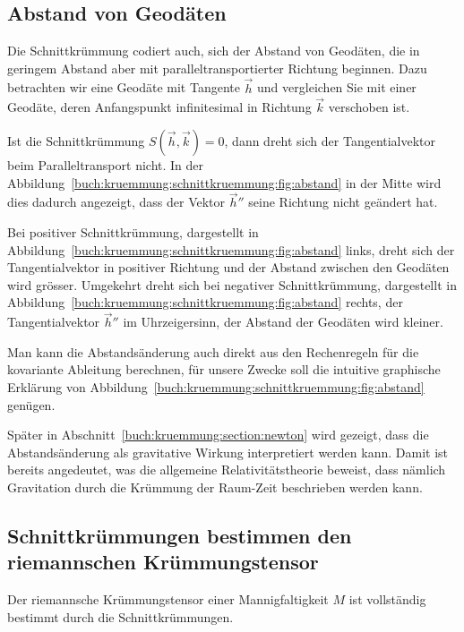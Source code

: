 %
%
\subsection{Abstand von Geodäten}

Die Schnittkrümmung codiert auch, sich der Abstand von Geodäten,
die in geringem Abstand aber mit paralleltransportierter Richtung
beginnen.
Dazu betrachten wir eine Geodäte mit Tangente $\vec{h}$ und
vergleichen Sie mit einer Geodäte, deren Anfangspunkt infinitesimal
in Richtung $\vec{k}$ verschoben ist.

Ist die Schnittkrümmung $S(\vec{h},\vec{k})=0$, dann dreht sich der
Tangentialvektor beim Paralleltransport nicht.
In der Abbildung~\ref{buch:kruemmung:schnittkruemmung:fig:abstand}
in der Mitte wird dies dadurch angezeigt, dass der Vektor $\vec{h}''$
seine Richtung nicht geändert hat.

Bei positiver Schnittkrümmung, dargestellt in
Abbildung~\ref{buch:kruemmung:schnittkruemmung:fig:abstand}
links, dreht sich der Tangentialvektor in positiver Richtung und der
Abstand zwischen den Geodäten wird grösser.
Umgekehrt dreht sich bei negativer Schnittkrümmung, dargestellt in
Abbildung~\ref{buch:kruemmung:schnittkruemmung:fig:abstand} rechts,
der Tangentialvektor $\vec{h}''$ im Uhrzeigersinn, der Abstand
der Geodäten wird kleiner.

Man kann die Abstandsänderung auch direkt aus den Rechenregeln für
die kovariante Ableitung berechnen, für unsere Zwecke soll die
intuitive graphische Erklärung von 
Abbildung~\ref{buch:kruemmung:schnittkruemmung:fig:abstand}
genügen.

Später in Abschnitt~\ref{buch:kruemmung:section:newton} wird gezeigt,
dass die Abstandsänderung als gravitative Wirkung interpretiert
werden kann.
Damit ist bereits angedeutet, was die allgemeine Relativitätstheorie
beweist, dass nämlich Gravitation durch die Krümmung der Raum-Zeit
beschrieben werden kann.

%
%
\subsection{Schnittkrümmungen bestimmen den riemannschen Krümmungstensor}

\begin{satz}
Der riemannsche Krümmungstensor einer Mannigfaltigkeit $M$
ist vollständig bestimmt durch die Schnittkrümmungen.
\end{satz}

